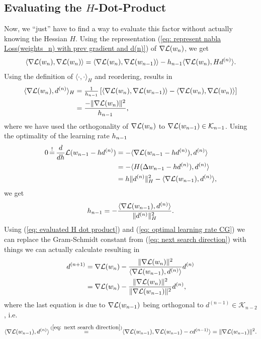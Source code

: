 \subsection{Evaluating the \(H\)-Dot-Product}

Now, we ``just'' have to find a way to evaluate this factor without actually
knowing the Hessian \(H\). Using the representation (\ref{eq: represent nabla Loss(weights_n) with
prev gradient and d(n)}) of \(\nabla\mathcal{L}(w_n)\), we get
\begin{align*}
	\langle \nabla\mathcal{L}(w_n), \nabla\mathcal{L}(w_n) \rangle
	= \langle \nabla\mathcal{L}(w_n), \nabla\mathcal{L}(w_{n-1}) \rangle
	- h_{n-1}\langle \nabla\mathcal{L}(w_n), H d^{(n)}\rangle.
\end{align*}
Using the definition of \(\langle\cdot,\cdot\rangle_H\) and reordering, results in
\begin{align}
	\nonumber
	\langle \nabla\mathcal{L}(w_n), d^{(n)}\rangle_H
	&= \tfrac1{h_{n-1}}\left[
		\langle \nabla\mathcal{L}(w_n), \nabla\mathcal{L}(w_{n-1}) \rangle
		- \langle \nabla\mathcal{L}(w_n), \nabla\mathcal{L}(w_n) \rangle
	\right]\\
	\label{eq: evaluated H dot product}
	&= \frac{- \|\nabla\mathcal{L}(w_n)\|^2}{h_{n-1}},
\end{align}
where we have used the orthogonality of \(\nabla\mathcal{L}(w_n)\) to
\(\nabla\mathcal{L}(w_{n-1})\in\mathcal{K}_{n-1}\).
Using the optimality of the learning rate \(h_{n-1}\)
\begin{align*}
	0\xeq{!}\frac{d}{d\lr}\Loss(\weights_{n-1} - \lr d^{(n)})
	&= -\langle \nabla\Loss(\weights_{n-1} - \lr d^{(n)}), d^{(n)} \rangle\\
	&= -\langle H(\Delta\weights_{n-1} -\lr d^{(n)}), d^{(n)} \rangle\\
	&= \lr\|d^{(n)}\|_H^2 - \langle \nabla\Loss(\weights_{n-1}), d^{(n)}\rangle,
\end{align*}
we get
\begin{align}\label{eq: optimal learning rate CG}
	h_{n-1}
	= - \frac{\langle \nabla\mathcal{L}(w_{n-1}), d^{(n)}\rangle}{\|d^{(n)}\|_H^2}.
\end{align}
Using (\ref{eq: evaluated H dot product}) and (\ref{eq: optimal learning rate CG})
we can replace the Gram-Schmidt constant from (\ref{eq: next search direction})
with things we can actually calculate resulting in
\begin{align*}
	d^{(n+1)}
	&= \nabla\mathcal{L}(w_n)
	- \frac{
		\|\nabla\mathcal{L}(w_n)\|^2
	}{\langle \nabla\mathcal{L}(w_{n-1}), d^{(n)}\rangle}d^{(n)}\\
	&= \nabla\mathcal{L}(w_n)
	- \frac{\|\nabla\mathcal{L}(w_n)\|^2}{\|\nabla\mathcal{L}(w_{n-1})\|^2}
	d^{(n)},
\end{align*}
where the last equation is due to \(\nabla\mathcal{L}(w_{n-1})\) being orthogonal
to \(d^{(n-1)}\in\mathcal{K}_{n-2}\), i.e.
\begin{align*}
	\langle \nabla\Loss(\weights_{n-1}), d^{(n)} \rangle
	\xeq{(\ref{eq: next search direction})} 
	\langle \nabla\Loss(\weights_{n-1}),\nabla\Loss(\weights_{n-1}) - c d^{(n-1)}\rangle
	= \|\nabla\Loss(\weights_{n-1})\|^2.
\end{align*}

